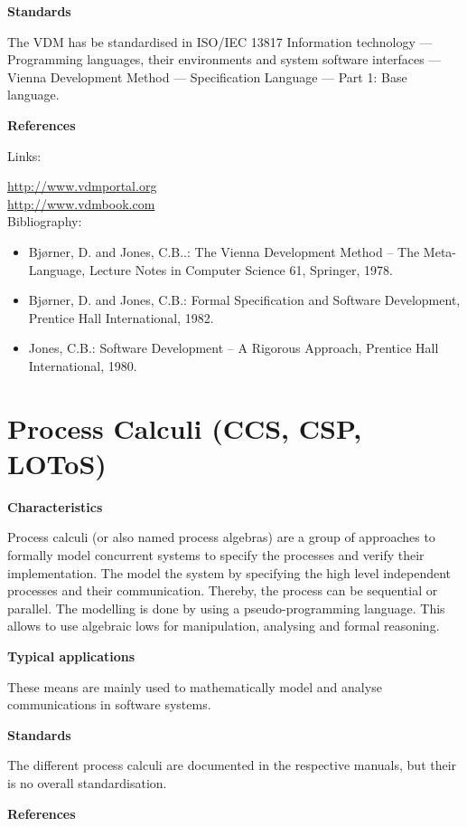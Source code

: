\documentclass{./template/openetcs_report}
\begin{document}
	\textbf{Standards}
	
	The VDM has be standardised in ISO/IEC 13817 Information technology — Programming languages, their environments and system software interfaces — Vienna Development Method — Specification Language — Part 1: Base language.
	
	\textbf{References}

Links:

\url{http://www.vdmportal.org} \\[4pt]
\url{http://www.vdmbook.com} \\[4pt]

Bibliography:

\begin{itemize}
\item Bj\o{}rner, D. and Jones, C.B..: The Vienna Development Method -- The Meta-Language, Lecture Notes in Computer Science 61, Springer, 1978. 
\item Bj\o{}rner, D. and Jones, C.B.: Formal Specification and Software Development, Prentice Hall International, 1982.
\item Jones, C.B.: Software Development -- A Rigorous Approach, Prentice Hall International, 1980.
\end{itemize}

\section{Process Calculi (CCS, CSP, LOToS) }

	\textbf{Characteristics}

Process calculi (or also named process algebras) are a group of approaches to formally model concurrent systems to specify the processes and verify their implementation. The model the system by specifying the high level independent processes and their communication. Thereby, the process can be sequential or parallel. The modelling is done by using a pseudo-programming language. This allows to use algebraic lows for manipulation, analysing and formal reasoning.

	\textbf{Typical applications}

These means are mainly used to mathematically model and analyse communications in software systems.

	\textbf{Standards}

The different process calculi are documented in the respective manuals, but their is no overall standardisation.

	\textbf{References}
\end{document}
